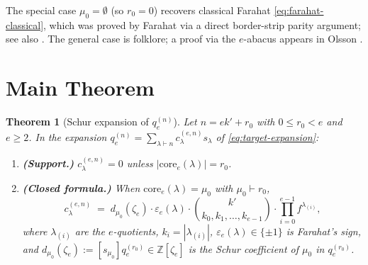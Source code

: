 \documentclass[11pt]{article}
\newtheorem{theorem}{Theorem}
\theoremstyle{definition}
\theoremstyle{remark}
\newcommand{\qen}{q_e^{(n)}}
\newcommand{\qer}{q_e^{(r_0)}}
\newcommand{\zetae}{\zeta_e}
\newcommand{\ZZ}{\mathbb{Z}}
\newcommand{\core}{\mathrm{core}}
\begin{document}
The special case $\mu_0=\emptyset$ (so $r_0=0$) recovers classical Farahat
\eqref{eq:farahat-classical}, which was proved by Farahat \cite{Far54} via a
direct border-strip parity argument; see also
\cite[Ex.~7.60(d)]{Sta99}. The general case is folklore; a proof via
the $e$-abacus appears in Olsson \cite[Thm.~5.4]{Ols93}.

\section{Main Theorem}
\label{sec:main}

\begin{theorem}[Schur expansion of $\qen$]
\label{thm:main}
Let $n=ek'+r_0$ with $0\le r_0<e$ and $e\ge 2$. In the expansion
$\qen=\sum_{\lambda\vdash n}c_\lambda^{(e,n)}s_\lambda$ of \eqref{eq:target-expansion}:
\begin{enumerate}
\item[(a)] \textbf{(Support.)} $c_\lambda^{(e,n)}=0$ unless $|\core_e(\lambda)|=r_0$.
\item[(b)] \textbf{(Closed formula.)} When $\core_e(\lambda)=\mu_0$ with $\mu_0\vdash r_0$,
\begin{equation}
\label{eq:main}
  c_\lambda^{(e,n)}\;=\;
  d_{\mu_0}(\zetae)\cdot
  \varepsilon_e(\lambda)\cdot
  \binom{k'}{k_0,k_1,\ldots,k_{e-1}}\cdot
  \prod_{i=0}^{e-1}f^{\lambda_{(i)}},
\end{equation}
where $\lambda_{(i)}$ are the $e$-quotients, $k_i=|\lambda_{(i)}|$,
$\varepsilon_e(\lambda)\in\{\pm 1\}$ is Farahat's sign, and
$d_{\mu_0}(\zetae):=[s_{\mu_0}]\qer\in\ZZ[\zetae]$ is the Schur coefficient of
$\mu_0$ in $\qer$.
\end{enumerate}
\end{theorem}
\end{document}
